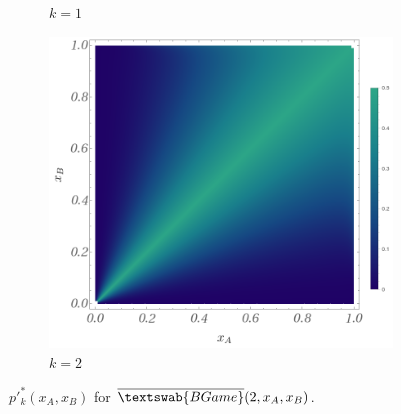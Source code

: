 \documentclass{article}
\theoremstyle{definition}
\newcommand{\InfBG}[1]{$\overline{\textswab{BGame}}(#1)$}
\begin{document}
\begin{figure}[H]
\begin{subfigure}[b]{0.3\textwidth}
        \caption{$k=1$}
        \label{fig:ppkBG_2_1}
    \end{subfigure}
    \hspace{0.01\textwidth} %
    \begin{subfigure}[b]{0.3\textwidth}
        \includegraphics[width=\textwidth]{img/BinomialBayesian_ppk_2_2.png}
        \caption{$k=2$}
        \label{fig:ppkBG_2_2}
    \end{subfigure}
    
    \caption{$p'^*_k(x_A,x_B)$ for \InfBG{2,x_A,x_B}.}
    \label{fig:ppk_InfBG_2_012}
\end{figure}
\end{document}
